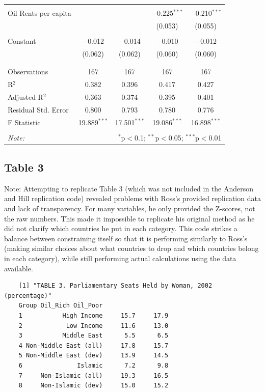 \documentclass[12pt,letterpaper]{article}
\begin{document}
\begin{table}[!htbp]
\begin{tabular}{@{\extracolsep{1pt}}lcccc}
		& & & & \\ 
		Oil Rents per capita &  &  & $-$0.225$^{***}$ & $-$0.210$^{***}$ \\ 
		&  &  & (0.053) & (0.055) \\ 
		& & & & \\ 
		Constant & $-$0.012 & $-$0.014 & $-$0.010 & $-$0.012 \\ 
		& (0.062) & (0.062) & (0.060) & (0.060) \\ 
		& & & & \\ 
		\hline \\[-1.8ex] 
		Observations & 167 & 167 & 167 & 167 \\ 
		R$^{2}$ & 0.382 & 0.396 & 0.417 & 0.427 \\ 
		Adjusted R$^{2}$ & 0.363 & 0.374 & 0.395 & 0.401 \\ 
		Residual Std. Error & 0.800 & 0.793 & 0.780 & 0.776 \\ 
		F Statistic & 19.889$^{***}$ & 17.501$^{***}$ & 19.086$^{***}$ & 16.898$^{***}$ \\ 
		\hline 
		\hline \\[-1.8ex] 
		\textit{Note:}  & \multicolumn{4}{r}{$^{*}$p$<$0.1; $^{**}$p$<$0.05; $^{***}$p$<$0.01} \\ 
	\end{tabular} 
\end{table} 

\newpage

\subsection*{Table 3}


Note: Attempting to replicate Table 3 (which was not included in the Anderson and Hill replication code) revealed problems with Ross's provided replication data and lack of transparency. For many variables, he only provided the Z-scores, not the raw numbers. This made it impossible to replicate his original method as he did not clarify which countries he put in each category. This code strikes a balance between constraining itself so that it is performing similarly to Ross's (making similar choices about what countries to drop and which countries belong in each category), while still performing actual calculations using the data available.

\vspace{.25cm}

\begin{verbatim}
	[1] "TABLE 3. Parliamentary Seats Held by Woman, 2002 (percentage)"
	Group Oil_Rich Oil_Poor
	1           High Income     15.7     17.9
	2            Low Income     11.6     13.0
	3           Middle East      5.5      6.5
	4 Non-Middle East (all)     17.8     15.7
	5 Non-Middle East (dev)     13.9     14.5
	6               Islamic      7.2      9.8
	7     Non-Islamic (all)     19.3     16.5
	8     Non-Islamic (dev)     15.0     15.2
\end{verbatim}
\end{document}
